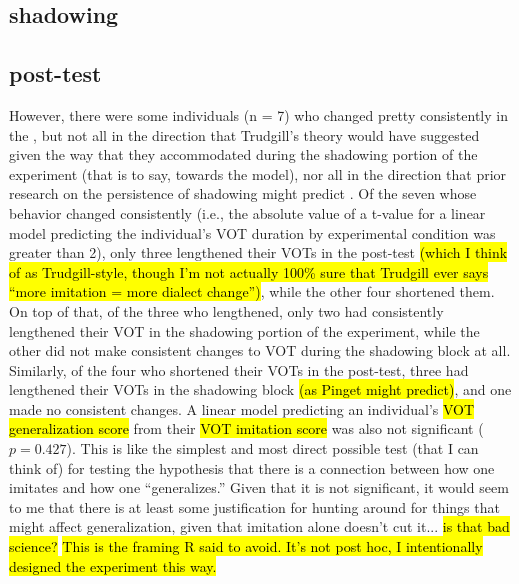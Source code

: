 \subsection{shadowing}
\subsection{post-test}
However, there were some individuals (n = 7) who changed pretty consistently in the , but not all in the direction that Trudgill's theory would have suggested given the way that they accommodated during the shadowing portion of the experiment (that is to say, towards the model), nor all in the direction that prior research on the persistence of shadowing might predict \citep{pinget2015actuation}. Of the seven whose behavior changed consistently (i.e., the absolute value of a t-value for a linear model predicting the individual's \ND{} VOT duration by experimental condition was greater than 2), only three lengthened their VOTs in the post-test \hl{(which I think of as Trudgill-style, though I'm not actually 100\% sure that Trudgill ever says ``more imitation = more dialect change'')}, while the other four shortened them. On top of that, of the three who lengthened, only two had consistently lengthened their VOT in the shadowing portion of the experiment, while the other did not make consistent changes to VOT during the shadowing block at all. Similarly, of the four who shortened their VOTs in the post-test, three had lengthened their VOTs in the shadowing block \hl{(as Pinget might predict)}, and one made no consistent changes. A linear model predicting an individual's \hl{VOT generalization score} from their \hl{VOT imitation score} was also not significant ($p = 0.427$).%
This is like the simplest and most direct possible test (that I can think of) for testing the hypothesis that there is a connection between how one imitates and how one ``generalizes.''%
Given that it is not significant, it would seem to me that there is at least some justification for hunting around for things that might affect generalization, given that imitation alone doesn't cut it... \hl{is that bad science?}%
\hl{This is the framing R said to avoid. It’s not post hoc, I intentionally designed the experiment this way.}

